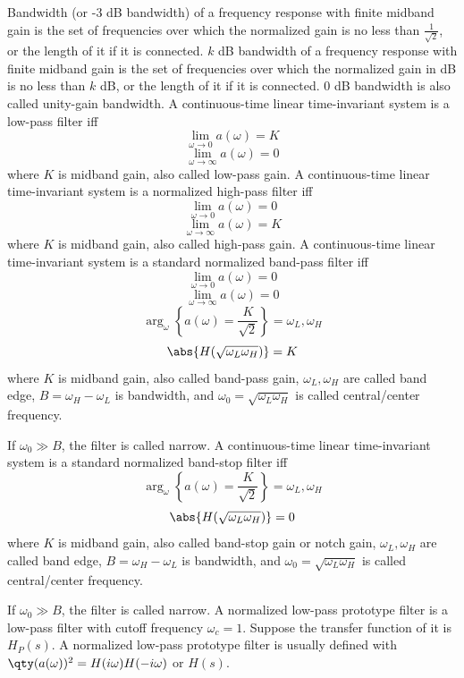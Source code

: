 \documentclass[a4paper,12pt]{report}
\begin{document}
Bandwidth (or -3 dB bandwidth) of a frequency response with finite midband gain is the set of frequencies over which the normalized gain is no less than $\frac{1}{\sqrt{2}}$, or the length of it if it is connected. $k$ dB bandwidth of a frequency response with finite midband gain is the set of frequencies over which the normalized gain in dB is no less than $k$ dB, or the length of it if it is connected. 0 dB bandwidth is also called unity-gain bandwidth.
A continuous-time linear time-invariant system is a low-pass filter iff
\[\lim_{\omega\to 0}a(\omega)=K\]
\[\lim_{\omega\to\infty}a(\omega)=0\]
where $K$ is midband gain, also called low-pass gain.
A continuous-time linear time-invariant system is a normalized high-pass filter iff
\[\lim_{\omega\to 0}a(\omega)=0\]
\[\lim_{\omega\to\infty}a(\omega)=K\]
where $K$ is midband gain, also called high-pass gain.
A continuous-time linear time-invariant system is a standard normalized band-pass filter iff
\[\lim_{\omega\to 0}a(\omega)=0\]
\[\lim_{\omega\to\infty}a(\omega)=0\]
\[\arg_{\omega}\left\{a(\omega)=\frac{K}{\sqrt{2}}\right\}=\omega_L,\omega_H\]
\[\abs{H(\sqrt{\omega_L\omega_H})}=K\]
where $K$ is midband gain, also called band-pass gain, $\omega_L,\omega_H$ are called band edge, $B=\omega_H-\omega_L$ is bandwidth, and $\omega_0=\sqrt{\omega_L\omega_H}$ is called central/center frequency.

If $\omega_0\gg B$, the filter is called narrow.
A continuous-time linear time-invariant system is a standard normalized band-stop filter iff
\[\arg_{\omega}\left\{a(\omega)=\frac{K}{\sqrt{2}}\right\}=\omega_L,\omega_H\]
\[\abs{H(\sqrt{\omega_L\omega_H})}=0\]
where $K$ is midband gain, also called band-stop gain or notch gain, $\omega_L,\omega_H$ are called band edge, $B=\omega_H-\omega_L$ is bandwidth, and $\omega_0=\sqrt{\omega_L\omega_H}$ is called central/center frequency.

If $\omega_0\gg B$, the filter is called narrow.
A normalized low-pass prototype filter is a low-pass filter with cutoff frequency $\omega_c=1$. Suppose the transfer function of it is $H_P(s)$. A normalized low-pass prototype filter is usually defined with $\qty(a(\omega))^2=H(i\omega)H(-i\omega)$ or $H(s)$.
\end{document}
